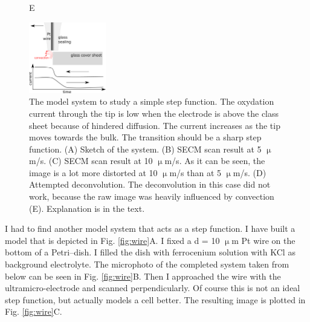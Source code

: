 \documentclass[a4paper, 11pt, oneside, bibliography=totoc]{article}
\begin{document}
\begin{figure}
\vspace{0.5cm}
\begin{flushleft}\hspace{3cm}E\end{flushleft}

\centering
 \includegraphics[width=0.3\textwidth]{step_conv.eps}
\caption{The model system to study a simple step function. The oxydation current through the tip is low when the electrode is above the class sheet because of hindered diffusion. The current increases as the tip moves towards the bulk. The transition should be a sharp step function. (A) Sketch of the system. (B) SECM scan result at 5 $\upmu$m/s. (C) SECM scan result at 10 $\upmu$m/s. As it can be seen, the image is a lot more distorted at 10 $\upmu$m/s than at 5 $\upmu$m/s. (D) Attempted deconvolution. The deconvolution in this case did not work, because the raw image was heavily influenced by convection (E). Explanation is in the text.}
\label{fig:step}
\end{figure}

I had to find another model system that acts as a step function. I have built a model that is depicted in Fig. \ref{fig:wire}A. I fixed a d = 10 $\upmu$m Pt wire on the bottom of a Petri--dish. I filled the dish with ferrocenium solution with KCl as background electrolyte. The microphoto of the completed system taken from below can be seen in Fig. \ref{fig:wire}B. Then I approached the wire with the ultramicro-electrode and scanned perpendicularly. Of course this is not an ideal step function, but actually models a cell better. The resulting image is plotted in Fig. \ref{fig:wire}C.
\end{document}
